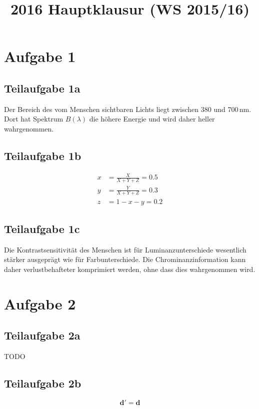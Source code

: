 \documentclass[a4paper]{scrartcl}
\begin{document}
\title{2016 Hauptklausur (WS 2015/16)}

\setcounter{section}{1}
\section*{Aufgabe 1}
\subsection*{Teilaufgabe 1a}
Der Bereich des vom Menschen sichtbaren Lichts liegt zwischen 380 und 700\,nm.
Dort hat Spektrum $B(\lambda)$ die höhere Energie und wird daher heller wahrgenommen.

\subsection*{Teilaufgabe 1b}
\begin{align*}
x &= \frac{X}{X+Y+Z} = 0.5\\
y &= \frac{Y}{X+Y+Z} = 0.3\\
z &= 1 - x - y = 0.2
\end{align*}

\subsection*{Teilaufgabe 1c}
Die Kontrastsensitivität des Menschen ist für Luminanzunterschiede wesentlich stärker ausgeprägt wie für Farbunterschiede.
Die Chrominanzinformation kann daher verlustbehafteter komprimiert werden, ohne dass dies wahrgenommen wird.

\section*{Aufgabe 2}
\subsection*{Teilaufgabe 2a}
TODO

\subsection*{Teilaufgabe 2b}
\[\mathbf{d}' = \mathbf{d}\]
\end{document}
